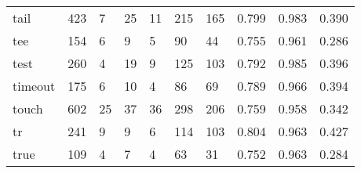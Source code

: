 \begin{longtable}{lp{2.0cm}p{2.0cm}p{2.0cm}p{2.0cm}p{2.0cm}p{2.0cm}p{2.0cm}p{2.0cm}p{2.0cm}}
tail      &                    423 &                                  7 &                                25 &                               11 &                               215 &                             165 &                                   0.799 &                                  0.983 &                                0.390 \\
tee       &                    154 &                                  6 &                                 9 &                                5 &                                90 &                              44 &                                   0.755 &                                  0.961 &                                0.286 \\
test      &                    260 &                                  4 &                                19 &                                9 &                               125 &                             103 &                                   0.792 &                                  0.985 &                                0.396 \\
timeout   &                    175 &                                  6 &                                10 &                                4 &                                86 &                              69 &                                   0.789 &                                  0.966 &                                0.394 \\
touch     &                    602 &                                 25 &                                37 &                               36 &                               298 &                             206 &                                   0.759 &                                  0.958 &                                0.342 \\
tr        &                    241 &                                  9 &                                 9 &                                6 &                               114 &                             103 &                                   0.804 &                                  0.963 &                                0.427 \\
true      &                    109 &                                  4 &                                 7 &                                4 &                                63 &                              31 &                                   0.752 &                                  0.963 &                                0.284 \\

\end{longtable}
